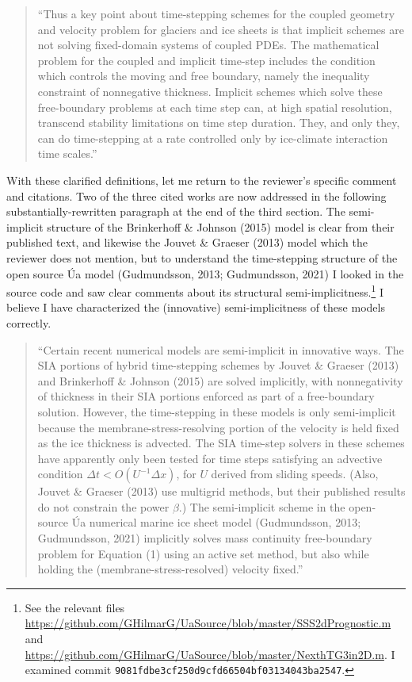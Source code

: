 \documentclass[letterpaper,final,12pt,reqno]{amsart}
\begin{document}
\begin{quote}
``Thus a key point about time-stepping schemes for the coupled geometry and velocity problem for glaciers and ice sheets is that implicit schemes are not solving fixed-domain systems of coupled PDEs.  The mathematical problem for the coupled and implicit time-step includes the condition which controls the moving and free boundary, namely the inequality constraint of nonnegative thickness.  Implicit schemes which solve these free-boundary problems at each time step can, at high spatial resolution, transcend stability limitations on time step duration.  They, and only they, can do time-stepping at a rate controlled only by ice-climate interaction time scales.''
\end{quote}

With these clarified definitions, let me return to the reviewer's specific comment and citations.  Two of the three cited works are now addressed in the following substantially-rewritten paragraph at the end of the third section.  The semi-implicit structure of the Brinkerhoff \& Johnson (2015) model is clear from their published text, and likewise the Jouvet \& Graeser (2013) model which the reviewer does not mention, but to understand the time-stepping structure of the open source \'Ua model (Gudmundsson, 2013; Gudmundsson, 2021) I looked in the source code and saw clear comments about its structural semi-implicitness.\footnote{See the relevant files \url{https://github.com/GHilmarG/UaSource/blob/master/SSS2dPrognostic.m} and \url{https://github.com/GHilmarG/UaSource/blob/master/NexthTG3in2D.m}.  I examined commit \texttt{9081fdbe3cf250d9cfd66504bf03134043ba2547}.}  I believe I have characterized the (innovative) semi-implicitness of these models correctly.

\begin{quote}
``Certain recent numerical models are semi-implicit in innovative ways.  The SIA portions of hybrid time-stepping schemes by Jouvet \& Graeser (2013) and Brinkerhoff \& Johnson (2015) are solved implicitly, with nonnegativity of thickness in their SIA portions enforced as part of a free-boundary solution.  However, the time-stepping in these models is only semi-implicit because the membrane-stress-resolving portion of the velocity is held fixed as the ice thickness is advected.  The SIA time-step solvers in these schemes have apparently only been tested for time steps satisfying an advective condition $\Delta t < O(U^{-1}\Delta x)$, for $U$ derived from sliding speeds.  (Also, Jouvet \& Graeser (2013) use multigrid methods, but their published results do not constrain the power $\beta$.)  The semi-implicit scheme in the open-source \'Ua numerical marine ice sheet model (Gudmundsson, 2013; Gudmundsson, 2021) implicitly solves mass continuity free-boundary problem for Equation (1) using an active set method, but also while holding the (membrane-stress-resolved) velocity fixed.''
\end{quote}
\end{document}
